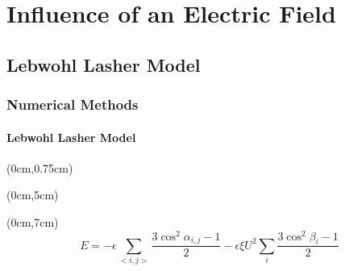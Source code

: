 \documentclass{beamer}
\begin{document}
\section{Influence of an Electric Field}
\subsection{Lebwohl Lasher Model}
\begin{frame}
	\frametitle{Numerical Methods}
	\framesubtitle{Lebwohl Lasher Model}

\begin{textblock*}{13cm}(0cm,0.75cm) %
\begin{center}
	
\end{center}
\end{textblock*}

\begin{textblock*}{13cm}(0cm,5cm) %
\center
{}
\end{textblock*}

\begin{textblock*}{13cm}(0cm,7cm) %
\begin{equation*}
E = - \epsilon\sum_{<i,j>} \frac{3\cos^2\alpha_{i,j}-1}{2} - \epsilon \xi U^2 \sum_{i}\frac{3\cos^2\beta_i-1}{2}
\end{equation*}

\end{textblock*}
\end{frame}
\end{document}
